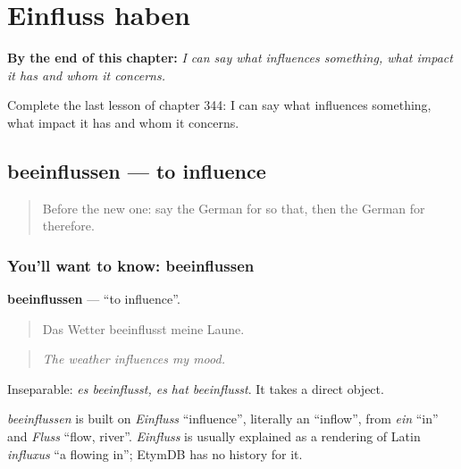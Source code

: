 
\chapter{Einfluss haben}
\label{ch:ge-einfluss-haben}

\begin{chapteropening}
\textbf{By the end of this chapter:} \emph{I can say what influences something, what impact it has and whom it concerns.}

Complete the last lesson of chapter 344: I can say what influences something, what impact it has and whom it concerns.
\end{chapteropening}

\section[beeinflussen]{beeinflussen — to influence}

\label{lesson:GE-C344-beeinflussen}



\begin{quote}
Before the new one: say the German for so that, then the German for therefore.
\end{quote}

\subsection*{You'll want to know: beeinflussen}
\textbf{beeinflussen} — \textquotedblleft{}to influence\textquotedblright{}.

\begin{quote}
Das Wetter beeinflusst meine Laune.
\end{quote}

\begin{quote}
\emph{The weather influences my mood.}
\end{quote}

Inseparable: \emph{es beeinflusst, es hat beeinflusst}. It takes a direct object.

\begin{cousinweb}
\emph{beeinflussen} is built on \emph{Einfluss} \textquotedblleft{}influence\textquotedblright{}, literally an \textquotedblleft{}inflow\textquotedblright{}, from \emph{ein} \textquotedblleft{}in\textquotedblright{} and \emph{Fluss} \textquotedblleft{}flow, river\textquotedblright{}. \emph{Einfluss} is usually explained as a rendering of Latin \emph{influxus} \textquotedblleft{}a flowing in\textquotedblright{}; EtymDB has no history for it.
\end{cousinweb}

